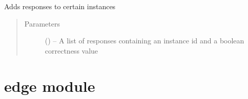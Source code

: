 \documentclass[letterpaper,10pt,english]{sphinxmanual}
\begin{document}
\begin{fulllineitems}
\begin{fulllineitems}
\label{\detokenize{consumer:consumer.Consumer.validate}}
Adds responses to certain instances
\begin{quote}\begin{description}
\item[{Parameters}] \leavevmode
{} (\href{https://docs.python.org/2/library/functions.html\#list}{}\sphinxstyleliteralemphasis{(}\href{https://docs.python.org/2/library/stdtypes.html\#dict}{}\sphinxstyleliteralemphasis{)}\sphinxstyleliteralemphasis{}) -- A list of responses containing an instance id and a boolean correctness value

\end{description}\end{quote}

\end{fulllineitems}


\end{fulllineitems}



\section{edge module}
\label{\detokenize{edge:edge-module}}\label{\detokenize{edge:module-edge}}\label{\detokenize{edge::doc}}
\end{document}
